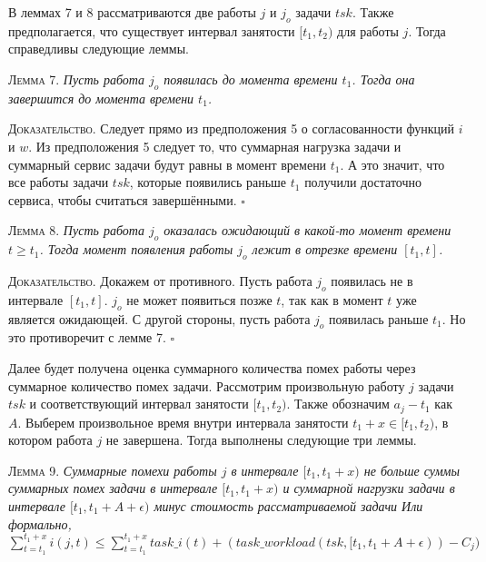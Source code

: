 \documentclass[14pt]{matmex-diploma-custom}
\begin{document}
В леммах 7 и 8 рассматриваются две работы $j$ и $j_o$ задачи $tsk$. Также предполагается, что существует интервал занятости $[t_1, t_2)$ для работы $j$. Тогда справедливы следующие леммы.

\textsc{Лемма 7.}
\textit{Пусть работа $j_o$ появилась до момента времени $t_1$. Тогда она завершится до момента времени $t_1$. }

\textsc{Доказательство.} Следует прямо из предположения 5 о согласованности функций $i$ и $w$. 
  Из предположения 5 следует то, что суммарная нагрузка задачи и суммарный сервис 
  задачи будут равны в момент времени $t_1$. А это значит, что все работы задачи $tsk$, 
    которые появились раньше $t_1$ получили достаточно сервиса, чтобы считаться завершёнными. $\square$

\textsc{Лемма 8.}
\textit{Пусть работа $j_o$ оказалась ожидающий в какой-то момент времени $t \geq t_1$. Тогда момент появления работы $j_o$ лежит в отрезке времени $[t_1, t]$. }

\textsc{Доказательство.} Докажем от противного. Пусть работа $j_o$ появилась не в интервале $[t_1, t]$.
  $j_o$ не может появиться позже $t$, так как в момент $t$ уже является ожидающей. 
  С другой стороны, пусть работа  $j_o$ появилась раньше $t_1$. Но это противоречит с лемме 7. 
  $\square$

Далее будет получена оценка суммарного количества помех работы через суммарное количество 
  помех задачи. Рассмотрим произвольную работу $j$ задачи $tsk$ и соответствующий 
  интервал занятости $[t_1, t_2)$. Также обозначим $a_j - t_1$ как $A$. Выберем 
  произвольное время внутри интервала занятости $t_1 + x \in [t_1, t_2)$, 
  в котором работа $j$ не завершена. Тогда выполнены следующие три леммы.

\textsc{Лемма 9.}
\textit{Суммарные помехи работы $j$ в интервале $[t_1, t_1 + x)$ не больше суммы
    суммарных помех задачи в интервале $[t_1, t_1 + x)$ и
    суммарной нагрузки задачи в интервале $[t_1, t_1 + A + \epsilon)$ 
    минус стоимость рассматриваемой задачи
  Или формально, 
   $\sum_{t = t_1}^{t_1 + x} i(j,t) \leq 
     \sum_{t = t_1}^{t_1 + x} task\_i(t) + (task\_workload(tsk, [t_1, t_1 + A + \epsilon)) - C_{j})$ }
\end{document}
